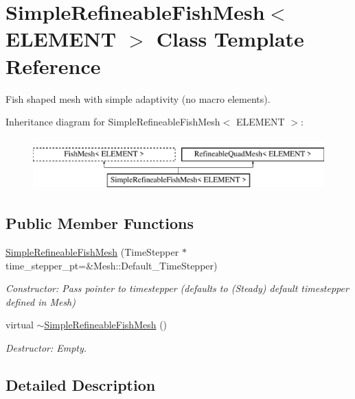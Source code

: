 \hypertarget{classSimpleRefineableFishMesh}{}\section{Simple\+Refineable\+Fish\+Mesh$<$ E\+L\+E\+M\+E\+NT $>$ Class Template Reference}
\label{classSimpleRefineableFishMesh}


Fish shaped mesh with simple adaptivity (no macro elements).  


Inheritance diagram for Simple\+Refineable\+Fish\+Mesh$<$ E\+L\+E\+M\+E\+NT $>$\+:\begin{figure}[H]
\begin{center}
\leavevmode
\includegraphics[height=2.000000cm]{classSimpleRefineableFishMesh}
\end{center}
\end{figure}
\subsection*{Public Member Functions}
\begin{DoxyCompactItemize}
\item 
\hyperlink{classSimpleRefineableFishMesh_acc2426825942faeef8842fc2c6cec5ad}{Simple\+Refineable\+Fish\+Mesh} (Time\+Stepper $\ast$time\+\_\+stepper\+\_\+pt=\&Mesh\+::\+Default\+\_\+\+Time\+Stepper)
\begin{DoxyCompactList}\small\item\em Constructor\+: Pass pointer to timestepper (defaults to (Steady) default timestepper defined in Mesh) \end{DoxyCompactList}\item 
virtual \hyperlink{classSimpleRefineableFishMesh_a5c9b22d3eb2d273b7fd1f44b8946b3b2}{$\sim$\+Simple\+Refineable\+Fish\+Mesh} ()
\begin{DoxyCompactList}\small\item\em Destructor\+: Empty. \end{DoxyCompactList}\end{DoxyCompactItemize}


\subsection{Detailed Description}
